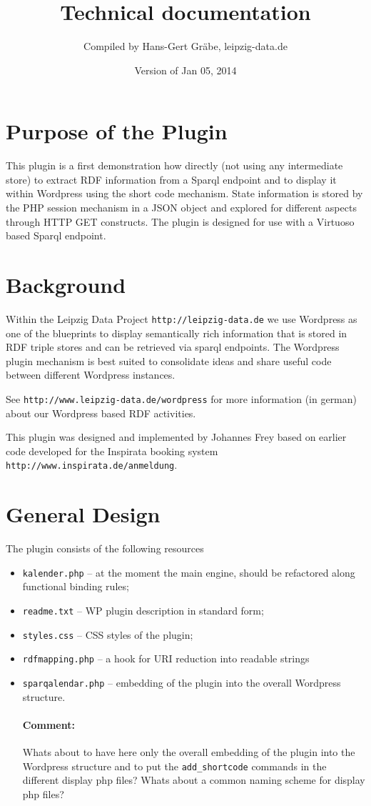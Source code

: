 \documentclass[11pt,a4paper]{article}
\title{Technical documentation}
\author{Compiled by Hans-Gert Gr\"abe, leipzig-data.de}
\date{Version of Jan 05, 2014}
\newcommand{\comment}[1]{\par\paragraph{Comment:} #1}
\begin{document}
\maketitle

\section{Purpose of the Plugin}

This plugin is a first demonstration how directly (not using any intermediate
store) to extract RDF information from a Sparql endpoint and to display it
within Wordpress using the short code mechanism.  State information is stored
by the PHP session mechanism in a JSON object and explored for different
aspects through HTTP GET constructs. The plugin is designed for use with a
Virtuoso based Sparql endpoint.

\section{Background}

Within the Leipzig Data Project \texttt{http://leipzig-data.de} we use
Wordpress as one of the blueprints to display semantically rich information
that is stored in RDF triple stores and can be retrieved via sparql endpoints.
The Wordpress plugin mechanism is best suited to consolidate ideas and share
useful code between different Wordpress instances.

See \texttt{http://www.leipzig-data.de/wordpress} for more information (in
german) about our Wordpress based RDF activities.

This plugin was designed and implemented by Johannes Frey based on earlier
code developed for the Inspirata booking system
\texttt{http://www.inspirata.de/anmeldung}.

\section{General Design}

The plugin consists of the following resources
\begin{itemize}       
\item \texttt{kalender.php} -- at the moment the main engine, should be
  refactored along functional binding rules;
\item \texttt{readme.txt} -- WP plugin description in standard form;
\item \texttt{styles.css} -- CSS styles of the plugin;
\item \texttt{rdfmapping.php} -- a hook for URI reduction into readable
  strings
\item \texttt{sparqalendar.php} -- embedding of the plugin into the overall
  Wordpress structure.

  \comment{Whats about to have here only the overall embedding of the plugin
    into the Wordpress structure and to put the \texttt{add\_shortcode}
    commands in the different display php files? Whats about a common naming
    scheme for display php files? }
\end{itemize}
\end{document}
